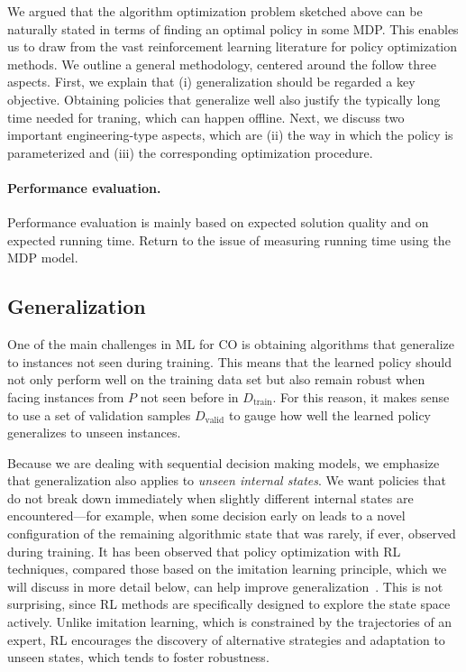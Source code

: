 \documentclass[a4paper]{report}
\theoremstyle{definition}
\theoremstyle{plain}
\newcommand\note[1]{{\color{Navy}\noindent#1}}
\begin{document}
We argued that the algorithm optimization problem sketched above can be
naturally stated in terms of finding an optimal policy in some MDP.
%
This enables us to draw from the vast reinforcement learning literature for
policy optimization methods.
%
We outline a general methodology, centered around the follow three
aspects.
%
First, we explain that (i) generalization should be regarded a key objective.
%
Obtaining policies that generalize well also justify the typically long time
needed for traning, which can happen offline.
%
Next, we discuss two important engineering-type aspects, which are (ii) the way
in which the policy is parameterized and (iii) the corresponding optimization
procedure.

\paragraph{Performance evaluation.}

\note{Performance evaluation is mainly based on expected solution quality and on
  expected running time. Return to the issue of measuring running time using the
  MDP model.}

\subsection{Generalization}

One of the main challenges in ML for CO is obtaining algorithms that generalize
to instances not seen during training.
%
This means that the learned policy should not only perform well on the training
data set but also remain robust when facing instances from $P$ not seen before
in $D_\text{train}$.
%
For this reason, it makes sense to use a set of validation samples
$D_\text{valid}$ to gauge how well the learned policy generalizes to unseen
instances.

Because we are dealing with sequential decision making models, we emphasize that
generalization also applies to \emph{unseen internal states}.
%
We want policies that do not break down immediately when slightly different
internal states are encountered---for example, when some decision early on leads
to a novel configuration of the remaining algorithmic state that was rarely, if
ever, observed during training.
%
It has been observed that policy optimization with RL techniques, compared those
based on the imitation learning principle, which we will discuss in more detail
below, can help improve
generalization~\cite{belloNeuralCombinatorialOptimization2017}. This is not
surprising, since RL methods are specifically designed to explore the state
space actively.
%
Unlike imitation learning, which is constrained by the trajectories of an
expert, RL encourages the discovery of alternative strategies and adaptation to
unseen states, which tends to foster robustness.
\end{document}
